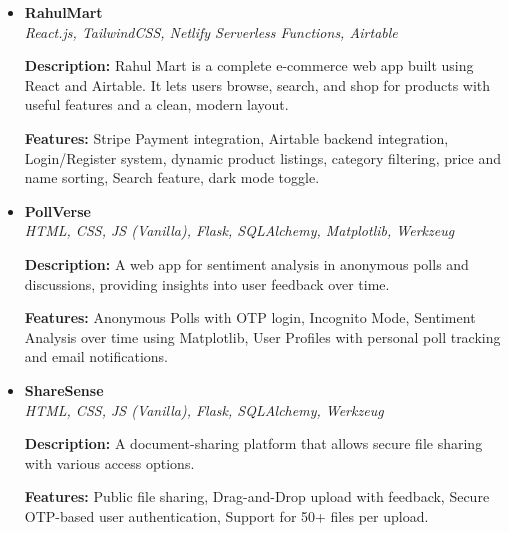 \documentclass[letterpaper,10pt]{article}
\begin{document}
\begin{itemize}

  \item \textbf{RahulMart} \hfill
    \href{https://rahulmart.netlify.app}{\underline{\faExternalLink}} \hspace{0.3cm}
    \href{https://github.com/Rahul122703/rahulmart}{\underline{\faGithub}} \\
  \textit{React.js, TailwindCSS, Netlify Serverless Functions, Airtable}

  \textbf{Description:} Rahul Mart is a complete e-commerce web app built using React and Airtable. It lets users browse, search, and shop for products with useful features and a clean, modern layout.

  \textbf{Features:} Stripe Payment integration, Airtable backend integration, Login/Register system, dynamic product listings, category filtering, price and name sorting, Search feature, dark mode toggle.

  \item \textbf{PollVerse} \hfill
    \href{https://pollversey.onrender.com}{\underline{\faExternalLink}} \hspace{0.3cm}
    \href{https://github.com/Rahul122703/pollverse}{\underline{\faGithub}} \\
  \textit{HTML, CSS, JS (Vanilla), Flask, SQLAlchemy, Matplotlib, Werkzeug}

  \textbf{Description:} A web app for sentiment analysis in anonymous polls and discussions, providing insights into user feedback over time.

  \textbf{Features:} Anonymous Polls with OTP login, Incognito Mode, Sentiment Analysis over time using Matplotlib, User Profiles with personal poll tracking and email notifications.

  \item \textbf{ShareSense} \hfill
  \href{https://sharesense.onrender.com} {\underline{\faExternalLink}} \hspace{0.3cm}
  \href{https://github.com/Rahul122703/rshare} {\underline{\faGithub}} \\
  \textit{HTML, CSS, JS (Vanilla), Flask, SQLAlchemy, Werkzeug}

  \textbf{Description:} A document-sharing platform that allows secure file sharing with various access options.

  \textbf{Features:} Public file sharing, Drag-and-Drop upload with feedback, Secure OTP-based user authentication, Support for 50+ files per upload.


\end{itemize}
\end{document}
